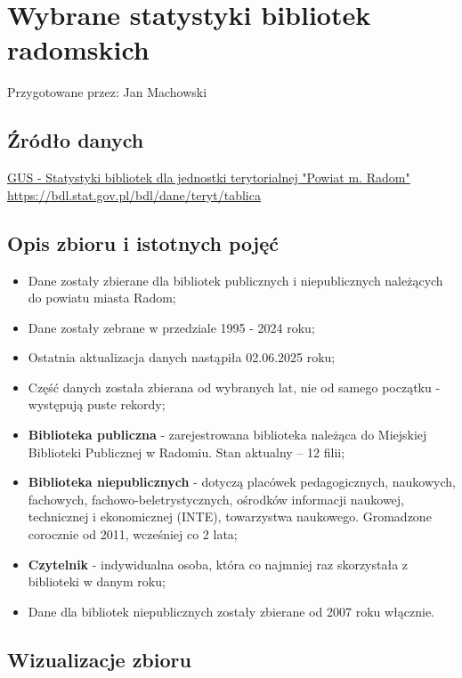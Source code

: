 \documentclass[12pt]{article}
\begin{document}
\section{Wybrane statystyki bibliotek radomskich}

Przygotowane przez: Jan Machowski

\subsection{Źródło danych}
\href{https://bdl.stat.gov.pl/bdl/dane/teryt/tablica}{GUS - Statystyki bibliotek dla jednostki terytorialnej "Powiat m. Radom"}\\
\url{https://bdl.stat.gov.pl/bdl/dane/teryt/tablica}

\subsection{Opis zbioru i istotnych pojęć}
\begin{itemize}
    \item Dane zostały zbierane dla bibliotek publicznych i niepublicznych należących do powiatu miasta Radom;
    \item Dane zostały zebrane w przedziale 1995 - 2024 roku;
    \item Ostatnia aktualizacja danych nastąpiła 02.06.2025 roku;
    \item Część danych została zbierana od wybranych lat, nie od samego początku - występują puste rekordy;
    \item \textbf{Biblioteka publiczna} - zarejestrowana biblioteka należąca do Miejskiej Biblioteki Publicznej w Radomiu. Stan aktualny – 12 filii;
    \item \textbf{Biblioteka niepublicznych} - dotyczą placówek pedagogicznych, naukowych, fachowych, fachowo-beletrystycznych, ośrodków informacji naukowej, 
                                        technicznej i ekonomicznej (INTE), towarzystwa naukowego. Gromadzone corocznie od 2011, wcześniej co 2 lata;
    \item \textbf{Czytelnik} - indywidualna osoba, która co najmniej raz skorzystała z biblioteki w danym roku;
    \item Dane dla bibliotek niepublicznych zostały zbierane od 2007 roku włącznie.
\end{itemize}


\subsection{Wizualizacje zbioru}
\end{document}
